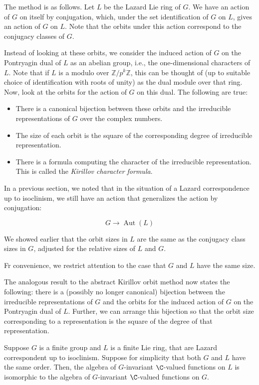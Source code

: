 The method is as follows. Let $L$ be the Lazard Lie ring of $G$. We
have an action of $G$ on itself by conjugation, which, under the set
identification of $G$ on $L$, gives an action of $G$ on $L$. Note that
the orbits under this action correspond to the conjugacy classes of
$G$.

Instead of looking at these orbits, we consider the induced action of
$G$ on the Pontryagin dual of $L$ as an abelian group, i.e., the
one-dimensional characters of $L$. Note that if $L$ is a modulo over
$\mathbb{Z}/p^k\mathbb{Z}$, this can be thought of (up to suitable
choice of identification with roots of unity) as the dual module over
that ring. Now, look at the orbits for the action of $G$ on this
dual. The following are true:

\begin{itemize}
\item There is a canonical bijection between these orbits and the
  irreducible representations of $G$ over the complex numbers.
\item The size of each orbit is the square of the corresponding degree
  of irreducible representation.
\item There is a formula computing the character of the irreducible
  representation. This is called the {\em Kirillov character formula}.
\end{itemize}

In a previous section, we noted that in the situation of a Lazard
correspondence up to isoclinism, we still have an action that
generalizes the action by conjugation:

$$G \to \operatorname{Aut}(L)$$

We showed earlier that the orbit sizes in $L$ are the same as the
conjugacy class sizes in $G$, adjusted for the relative sizes of $L$
and $G$.

Fr convenience, we restrict attention to the case that $G$ and $L$ have the same size.

The analogous result to the abstract Kirillov orbit method now states
the following: there is a (possibly no longer canonical) bijection
between the irreducible representations of $G$ and the orbits for the
induced action of $G$ on the Pontryagin dual of $L$. Further, we can
arrange this bijection so that the orbit size corresponding to a
representation is the square of the degree of that representation.


\begin{lemma}
  Suppose $G$ is a finite group and $L$ is a finite Lie ring, that are
  Lazard correspondent up to isoclinism. Suppose for simplicity that
  both $G$ and $L$ have the same order. Then, the algebra of
  $G$-invariant $\C$-valued functions on $L$ is isomorphic to the
  algebra of $G$-invariant $\C$-valued functions on $G$.
\end{lemma}

